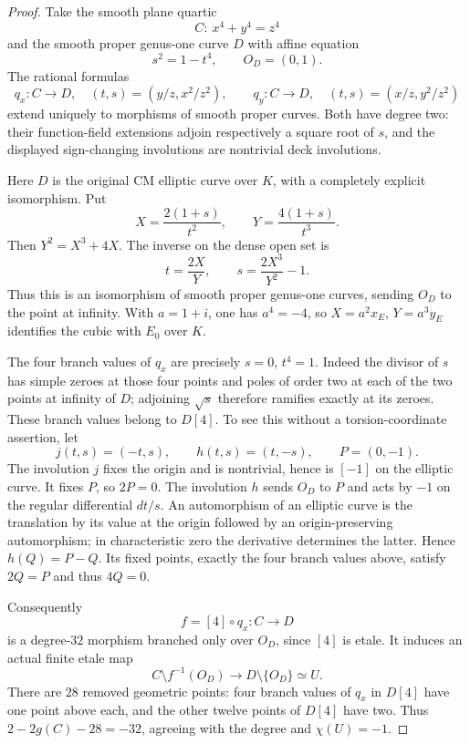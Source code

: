 \begin{proof}
Take the smooth plane quartic
\[
 C:\ x^4+y^4=z^4
\]
and the smooth proper genus-one curve $D$ with affine equation
\[
 s^2=1-t^4,\qquad O_D=(0,1).
\]
The rational formulas
\[
 q_x:C\longrightarrow D,\quad (t,s)=(y/z,x^2/z^2),\qquad
 q_y:C\longrightarrow D,\quad (t,s)=(x/z,y^2/z^2)
\]
extend uniquely to morphisms of smooth proper curves. Both have degree two: their function-field extensions adjoin respectively a square root of $s$, and the displayed sign-changing involutions are nontrivial deck involutions.

Here $D$ is the original CM elliptic curve over $K$, with a completely explicit isomorphism. Put
\[
 X=\frac{2(1+s)}{t^2},\qquad Y=\frac{4(1+s)}{t^3}.
\]
Then $Y^2=X^3+4X$. The inverse on the dense open set is
\[
 t=\frac{2X}{Y},\qquad s=\frac{2X^3}{Y^2}-1.
\]
Thus this is an isomorphism of smooth proper genus-one curves, sending $O_D$ to the point at infinity. With $a=1+i$, one has $a^4=-4$, so $X=a^2x_E$, $Y=a^3y_E$ identifies the cubic with $E_0$ over $K$.

The four branch values of $q_x$ are precisely $s=0$, $t^4=1$. Indeed the divisor of $s$ has simple zeroes at those four points and poles of order two at each of the two points at infinity of $D$; adjoining $\sqrt{s}$ therefore ramifies exactly at its zeroes. These branch values belong to $D[4]$. To see this without a torsion-coordinate assertion, let
\[
 j(t,s)=(-t,s),\qquad h(t,s)=(t,-s),\qquad P=(0,-1).
\]
The involution $j$ fixes the origin and is nontrivial, hence is $[-1]$ on the elliptic curve. It fixes $P$, so $2P=0$. The involution $h$ sends $O_D$ to $P$ and acts by $-1$ on the regular differential $dt/s$. An automorphism of an elliptic curve is the translation by its value at the origin followed by an origin-preserving automorphism; in characteristic zero the derivative determines the latter. Hence $h(Q)=P-Q$. Its fixed points, exactly the four branch values above, satisfy $2Q=P$ and thus $4Q=0$.

Consequently
\[
 f=[4]\circ q_x:C\longrightarrow D
\]
is a degree-$32$ morphism branched only over $O_D$, since $[4]$ is etale. It induces an actual finite etale map
\[
 C\setminus f^{-1}(O_D)\longrightarrow D\setminus\{O_D\}\simeq U.
\]
There are $28$ removed geometric points: four branch values of $q_x$ in $D[4]$ have one point above each, and the other twelve points of $D[4]$ have two. Thus $2-2g(C)-28=-32$, agreeing with the degree and $\chi(U)=-1$.


\end{proof}
